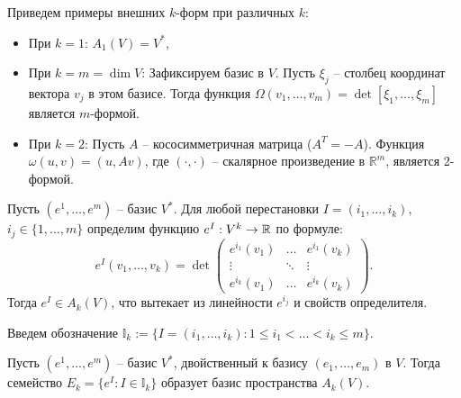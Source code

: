 \begin{example}
	Приведем примеры внешних $k$-форм при различных $k$:
	\begin{itemize}[itemsep = 0pt, topsep = 5pt]
		\item При $k = 1$: $A_1(V) = V^*$,
		\item При $k = m = \dim V$: Зафиксируем базис в $V$. Пусть $\xi_j$ -- столбец координат вектора $v_j$ в этом базисе. Тогда функция $\Omega(v_1, \dotsc, v_m) = \det [\xi_1, \dotsc, \xi_m]$ является $m$-формой.
		\item При $k = 2$: Пусть $A$ -- кососимметричная матрица ($A^T = -A$). Функция $\omega(u, v) = (u, Av)$, где $(\cdot, \cdot)$ -- скалярное произведение в $\mathbb{R}^m$, является 2-формой.
	\end{itemize}
\end{example}

\begin{definition}
	Пусть $(e^1, \dotsc, e^m)$ -- базис $V^*$.
	Для любой перестановки $I = (i_1, \dotsc, i_k)$, $i_j \in \{1, \dotsc, m\}$ определим функцию $e^I : V^k \to \mathbb{R}$ по формуле:
	\[ e^I (v_1, \dotsc, v_k) = \det \begin{pmatrix}
		e^{i_1}(v_1) & \dotsc & e^{i_1}(v_k) \\ 
		\vdots & \ddots & \vdots \\
		e^{i_k}(v_1) & \dotsc & e^{i_k}(v_k)  
	\end{pmatrix}. \]
	Тогда $e^I \in A_k(V)$, что вытекает из линейности $e^{i_j}$ и свойств определителя.
\end{definition}

Введем обозначение $\mathbb{I}_k := \{I = (i_1, \dotsc, i_k) : 1 \leq i_1 < \dotsc < i_k \leq m\}$.

\begin{theorem}
	Пусть $(e^1, \dotsc, e^m)$ -- базис $V^*$, двойственный к базису $(e_1, \dotsc, e_m)$ в $V$.
	Тогда семейство $E_k = \{e^I : I \in \mathbb{I}_k\}$ образует базис пространства $A_k(V)$.
\end{theorem}

